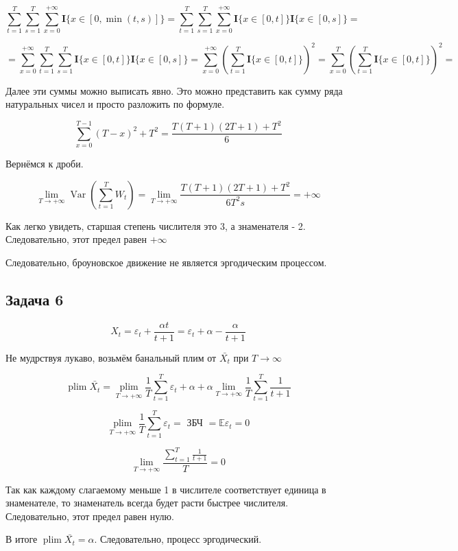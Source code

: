 \documentclass[a4paper,12pt]{article}
\def \e{\varepsilon}
\DeclareMathOperator*{\plim}{plim}
\def \mbf{\mathbf}
\def \mbb{\mathbb}
\DeclareMathOperator{\Var}{Var}
\def \E{\mbb{E}}
\def \I{\mbf{I}}
\def \e{\varepsilon}
\begin{document}
\[  \sum_{t = 1}^{T} \sum_{s = 1}^{T} \sum_{x=0}^{+\infty} \I\{x\in [0,\min(t,s)]\} = \sum_{t = 1}^{T} \sum_{s = 1}^{T} \sum_{x=0}^{+\infty} \I\{x\in [0, t]\}\I\{x\in [0, s]\} = \]

\[= \sum_{x=0}^{+\infty} \sum_{t = 1}^{T} \sum_{s = 1}^{T}  \I\{x\in [0, t]\}\I\{x\in [0, s]\} =  \sum_{x=0}^{+\infty} (\sum_{t = 1}^{T}  \I\{x\in [0, t]\})^2 =  \sum_{x=0}^{T} (\sum_{t = 1}^{T}  \I\{x\in [0, t]\})^2 = \]


Далее эти суммы можно выписать явно. Это можно представить как сумму ряда натуральных чисел и просто разложить по формуле.

\[ \sum_{x=0}^{T-1}(T-x)^2 + T^2  =  \frac{T(T+1)(2T+1) + T^2}{6}\]

Вернёмся к дроби.

\[ \lim\limits_{T\to +\infty}\Var(\sum_{t=1}^{T} W_t) = \lim\limits_{T\to +\infty} \frac{T(T+1)(2T+1) + T^2}{6T^2s} = +\infty \]

Как легко увидеть, старшая степень числителя это 3, а знаменателя - 2. Следовательно, этот предел равен $ +\infty $

Следовательно, броуновское движение не является эргодическим процессом.

\subsection{Задача 6}

\[ X_t = \e_t + \frac{\alpha t}{t + 1} = \e_t + \alpha - \frac{\alpha}{t + 1} \]

Не мудрствуя лукаво, возьмём банальный плим от $ \bar{X_t} $ при $ T \to \infty $

\[ \plim \bar{X_t} = \plim\limits_{T \to +\infty} \frac{1}{T} \sum_{t = 1}^{T} \e_t + \alpha + \alpha \lim\limits_{T \to +\infty}  \frac{1}{T}\sum_{t = 1}^{T}  \frac{1}{t+1}\]

\[  \plim\limits_{T \to +\infty} \frac{1}{T} \sum_{t = 1}^{T} \e_t = \text{ ЗБЧ } = \E\e_t = 0
 \]
 
 \[ \lim\limits_{T \to +\infty} \frac{\sum_{t = 1}^{T}  \frac{1}{t+1}}{T}  = 0 \]
 
 Так как каждому слагаемому меньше 1 в числителе соответствует единица в знаменателе, то знаменатель всегда будет расти быстрее числителя. Следовательно, этот предел равен нулю.
 
 В итоге $  \plim \bar{X_t} = \alpha $. Следовательно, процесс эргодический.
\end{document}

